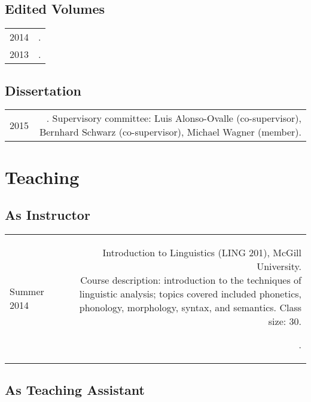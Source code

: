 \documentclass[12pt,letterpaper,twoside]{article}
\makeatletter
\newcommand{\bodywidth}{0.75}
\newenvironment{cvsection}{%
  \setlength{\extrarowheight}{0.70ex}
  \begin{longtable}[l]{@{} L R @{}}
}{%
  \end{longtable}
}
\newcommand{\course}[3]{%
  \parbox[t]{\bodywidth\textwidth}{#1.\\ {\footnotesize Course description: #2.
      Class size: #3.}}
}
\makeatother
\begin{document}
\subsection*{Edited Volumes}

\begin{cvsection}
  2014 & .\\
  2013 & .\\
\end{cvsection}

\subsection*{Dissertation}

\begin{cvsection}
  2015 & . Supervisory committee: Luis Alonso-Ovalle (co-supervisor), Bernhard Schwarz (co-supervisor), Michael Wagner (member).\\
\end{cvsection}

\section*{Teaching}

\subsection*{As Instructor}

\begin{cvsection}
  Summer 2014 & \course{Introduction to Linguistics (LING 201), McGill University}
  {introduction to the techniques of linguistic analysis; topics covered included phonetics, phonology, morphology, syntax, and semantics}
  {30}.
\end{cvsection}

\subsection*{As Teaching Assistant}
\end{document}
